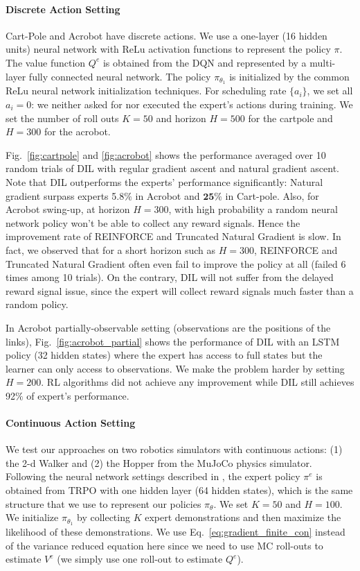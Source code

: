 \documentclass{article}
\begin{document}
\paragraph{Discrete Action Setting} Cart-Pole and Acrobot have discrete actions. We use a one-layer (16 hidden units) neural network with ReLu activation functions to represent the policy $\pi$. The value function $Q^e$ is obtained from the DQN \cite{mnih2015human} and represented by a multi-layer fully connected neural network. The policy $\pi_{\theta_1}$ is initialized by the common ReLu neural network initialization techniques. For scheduling rate $\{a_i\}$, we set all $a_i = 0$: we neither asked for nor executed the expert's actions during training. We set the number of roll outs $K = 50$ and horizon $H = 500$ for the cartpole and $H = 300$ for the acrobot.



Fig.~\ref{fig:cartpole} and \ref{fig:acrobot} shows the performance averaged over 10 random trials of DIL with regular gradient ascent and natural gradient ascent. Note that DIL outperforms the experts' performance significantly: Natural gradient surpass experts 5.8$\%$ in Acrobot and $\mathbf{25\%}$ in Cart-pole. Also, for Acrobot swing-up, at horizon $H=300$, with high probability a random neural network policy won't be able to collect any reward signals. Hence the improvement rate of REINFORCE and Truncated Natural Gradient is slow. In fact, we observed that for a short horizon such as $H=300$, REINFORCE and Truncated Natural Gradient often even fail to improve the policy at all (failed 6 times among 10 trials). On the contrary, DIL will not suffer from the delayed reward signal issue, since the expert will collect reward signals much faster than a random policy. 

In Acrobot partially-observable setting (observations are the positions of the links), Fig.~\ref{fig:acrobot_partial} shows the performance of DIL with an LSTM policy (32 hidden states) where the expert has access to full states but the learner can only access to observations. We make the problem harder by setting $H=200$. RL algorithms did not achieve any improvement while DIL still achieves 92$\%$ of expert's performance.

\paragraph{Continuous Action Setting}
We test our approaches on two robotics simulators with continuous actions: (1) the 2-d Walker and (2) the Hopper from the MuJoCo physics simulator. Following the neural network settings described in \citet{schulman2015trust}, the expert policy $\pi^e$ is obtained from TRPO with one hidden layer (64 hidden states), which is the same structure that we use to represent our policies $\pi_{\theta}$. We set $K = 50$ and $H = 100$. We initialize $\pi_{\theta_1}$ by collecting $K$ expert demonstrations and then maximize the likelihood of these demonstrations. We use Eq.~\ref{eq:gradient_finite_con} instead of the variance reduced equation here since we need to use MC roll-outs to estimate $V^e$ (we simply use one roll-out to estimate $Q^e$). %
\end{document}

